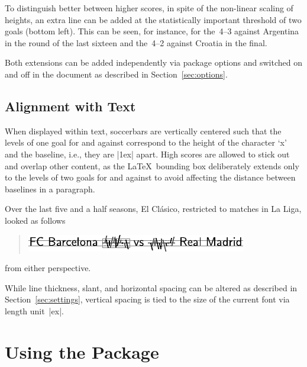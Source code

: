 \documentclass[a4paper,12pt]{ltxdoc}
\begin{document}
To distinguish better between higher scores,
in spite of the non-linear scaling of heights,
an extra line can be added at the statistically important threshold of two goals (bottom left). 
This can be seen, for instance,
for the~\mbox{4--3} against Argentina in the round of the last sixteen
and the~\mbox{4--2} against Croatia in the final. 

Both extensions can be added independently via package options
and switched on and off in the document as described in Section~\ref{sec:options}.  


\subsection{Alignment with Text}

When displayed within text, soccerbars are vertically centered
such that the levels of one goal for and against
correspond to the height of the character `x' and the baseline,
i.e., they are |1ex| apart.
High scores are allowed to stick out and overlap other content,
as the \LaTeX\ bounding box
deliberately extends only to the levels of two goals for and against
to avoid affecting the distance between baselines in a paragraph.

Over the last five and a half seasons, El Cl\'asico,
restricted to matches in La Liga,
looked as follows 
\begin{quote}
\includegraphics[width=\linewidth]{clasico}
\end{quote}
from either perspective.

While line thickness, slant, and horizontal spacing can be altered
as described in Section~\ref{sec:settings},
vertical spacing is tied to the size of the current font
via length unit~|ex|.



\section{Using the Package}
\newcommand\lfcfirstround{(4-1),(1-2)*,(3-1),(0-3)*,(3-1),(1-2)*,(0-1)*,(2-1),(1-1)*,(2-1),(1-2)*,(3-1),(1-2)*,(2-1),(5-2),(0-3)*,(2-0),(0-2)*,(0-4)*}
\newcommand\lfcsecondround{(1-0),(2-0),(0-1)*,(2-0),(1-2)*,(4-0),(0-1)*,(3-2),(3-0)*,(2-1),(0-0)*,(4-0),(4-0)*,(2-0),(1-3)*,(1-1),(2-1)*,(5-3),(1-3)*}
\newcommand\lfcseason{\lfcfirstround,\lfcsecondround}
\end{document}
